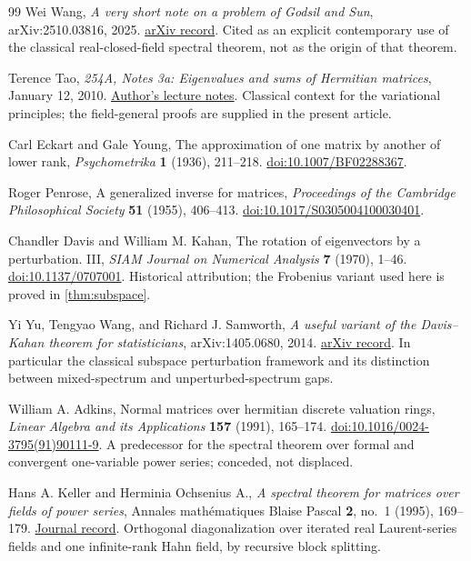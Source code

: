 \documentclass[11pt,a4paper]{article}
\numberwithin{equation}{section}
\theoremstyle{definition}
\theoremstyle{remark}
\begin{document}
\begin{thebibliography}{99}
Wei Wang, \emph{A very short note on a problem of Godsil and Sun},
arXiv:2510.03816, 2025.
\href{https://arxiv.org/abs/2510.03816}{arXiv record}.
Cited as an explicit contemporary use of the classical real-closed-field
spectral theorem, not as the origin of that theorem.

Terence Tao, \emph{254A, Notes 3a: Eigenvalues and sums of Hermitian
matrices}, January 12, 2010.
\href{https://terrytao.wordpress.com/2010/01/12/254a-notes-3a-eigenvalues-and-sums-of-hermitian-matrices/}{Author's lecture notes}.
Classical context for the variational principles; the field-general proofs
are supplied in the present article.

Carl Eckart and Gale Young, The approximation of one matrix by another of
lower rank, \emph{Psychometrika} \textbf{1} (1936), 211--218.
\href{https://doi.org/10.1007/BF02288367}{doi:10.1007/BF02288367}.

Roger Penrose, A generalized inverse for matrices,
\emph{Proceedings of the Cambridge Philosophical Society}
\textbf{51} (1955), 406--413.
\href{https://doi.org/10.1017/S0305004100030401}{doi:10.1017/S0305004100030401}.

Chandler Davis and William M. Kahan, The rotation of eigenvectors by a
perturbation. III, \emph{SIAM Journal on Numerical Analysis}
\textbf{7} (1970), 1--46.
\href{https://doi.org/10.1137/0707001}{doi:10.1137/0707001}.
Historical attribution; the Frobenius variant
used here is proved in \cref{thm:subspace}.

Yi Yu, Tengyao Wang, and Richard J. Samworth,
\emph{A useful variant of the Davis--Kahan theorem for statisticians},
arXiv:1405.0680, 2014.
\href{https://arxiv.org/abs/1405.0680}{arXiv record}.
In particular the classical subspace perturbation framework and its
distinction between mixed-spectrum and unperturbed-spectrum gaps.

William A. Adkins, Normal matrices over hermitian discrete valuation rings,
\emph{Linear Algebra and its Applications} \textbf{157} (1991), 165--174.
\href{https://doi.org/10.1016/0024-3795(91)90111-9}{doi:10.1016/0024-3795(91)90111-9}.
A predecessor for the spectral theorem over formal and convergent
one-variable power series; conceded, not displaced.

Hans A. Keller and Herminia Ochsenius A., \emph{A spectral theorem for
matrices over fields of power series}, Annales math\'ematiques Blaise Pascal
\textbf{2}, no.~1 (1995), 169--179.
\href{https://ambp.centre-mersenne.org/item/AMBP_1995__2_1_169_0/}{Journal record}.
Orthogonal diagonalization over iterated real Laurent-series fields and one
infinite-rank Hahn field, by recursive block splitting.


\end{thebibliography}
\end{document}
